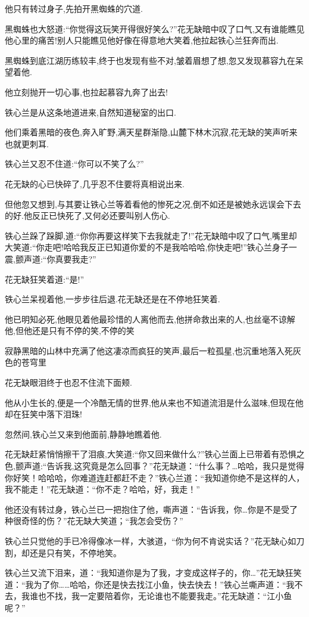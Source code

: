 \documentclass[12pt,oneside]{book}
\begin{document}
他只有转过身子,先拍开黑蜘蛛的穴道.

黑蜘蛛也大怒道:``你觉得这玩笑开得很好笑么?''花无缺暗中叹了口气,又有谁能瞧见他心里的痛苦!别人只能瞧见他好像在得意地大笑着,他拉起铁心兰狂奔而出.

黑蜘蛛到底江湖历练较丰,终于也发现有些不对,皱着眉想了想,忽又发现慕容九在呆望着他.

他立刻抛开一切心事,也拉起慕容九奔了出去!

铁心兰是从这条地道进来,自然知道秘室的出口.

他们乘着黑暗的夜色,奔入旷野,满天星群渐隐,山麓下林木沉寂,花无缺的笑声听来也就更刺耳.

铁心兰又忍不住道:``你可以不笑了么?''

花无缺的心已快碎了,几乎忍不住要将真相说出来.

但他忽又想到,与其要让铁心兰等着看他的惨死之况,倒不如还是被她永远误会下去的好.他反正已快死了,又何必还要叫别人伤心.

铁心兰跺了跺脚,道:``你你再要这样笑下去我就走了!''花无缺暗中叹了口气,嘴里却大笑道:``你走吧!哈哈我反正已知道你爱的不是我哈哈哈,你快走吧!''铁心兰身子一震,颤声道:``你真要我走?''

花无缺狂笑着道:``是!''

铁心兰呆视着他,一步步往后退.花无缺还是在不停地狂笑着.

他已明知必死,他眼见着他最珍惜的人离他而去,他拼命救出来的人,也丝毫不谅解他,但他还是只有不停的笑,不停的笑

寂静黑暗的山林中充满了他这凄凉而疯狂的笑声,最后一粒孤星,也沉重地落入死灰色的苍穹里

花无缺眼泪终于也忍不住流下面颊.

他从小生长的,便是一个冷酷无情的世界,他从来也不知道流泪是什么滋味,但现在他却在狂笑中落下泪珠!

忽然间,铁心兰又来到他面前,静静地瞧着他.

花无缺赶紧悄悄擦干了泪痕,大笑道:``你又回来做什么?''铁心兰面上已带着有恐惧之色,颤声道:``告诉我,这究竟是怎么回事？''花无缺道：``什么事？\ldots 哈哈，我只是觉得你好笑！哈哈哈，你难道连赶都赶不走？''铁心兰道：``我知道你绝不是这样的人，我不能走！''花无缺道：``你不走？哈哈，好，我走！''

他还没有转过身，铁心兰已一把抱住了他，嘶声道：``告诉我，你\ldots 你是不是受了种很奇怪的伤？''花无缺大笑道；``我怎会受伤？''

铁心兰只觉他的手已冷得像冰一样，大骇道，``你为何不肯说实话？''花无缺心如刀割，却还是只有笑，不停地笑。

铁心兰又流下泪来，道：``我知道你是为了我，才变成这样子的，你\ldots{}''花无缺狂笑道：``我为了你\ldots\ldots 哈哈，你还是快去找江小鱼，快去快去！''铁心兰嘶声道：``我不去，我谁也不找，我一定要陪着你，无论谁也不能要我走。''花无缺道：``江小鱼呢？''
\end{document}
